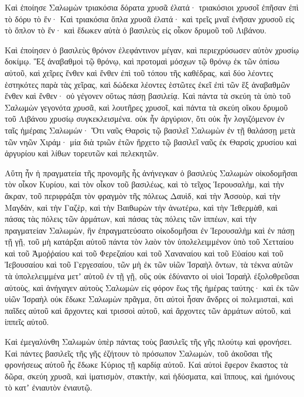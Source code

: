 {\par }{\PP {}Καὶ ἐποίησε Σαλωμὼν τριακόσια δόρατα χρυσᾶ ἐλατά· τριακόσιοι χρυσοῖ ἐπῆσαν ἐπὶ τὸ δόρυ τὸ ἕν·
Καὶ τριακόσια ὅπλα χρυσᾶ ἐλατά· καὶ τρεῖς μναῖ ἐνῆσαν χρυσοῦ εἰς τὸ ὅπλον τὸ ἕν· καὶ ἔδωκεν αὐτὰ ὁ βασιλεὺς εἰς οἶκον δρυμοῦ τοῦ Λιβάνου.
\par }{\PP {}Καὶ ἐποίησεν ὁ βασιλεὺς θρόνον ἐλεφάντινον μέγαν, καὶ περιεχρύσωσεν αὐτὸν χρυσίῳ δοκίμῳ.
Ἓξ ἀναβαθμοὶ τῷ θρόνῳ, καὶ προτομαὶ μόσχων τῷ θρόνῳ ἐκ τῶν ὀπίσω αὐτοῦ, καὶ χεῖρες ἔνθεν καὶ ἔνθεν ἐπὶ τοῦ τόπου τῆς καθέδρας, καὶ δύο λέοντες ἑστηκότες παρὰ τὰς χεῖρας,
καὶ δώδεκα λέοντες ἑστῶτες ἐκεῖ ἐπὶ τῶν ἓξ ἀναβαθμῶν ἔνθεν καὶ ἔνθεν· οὐ γέγονεν οὕτως πάσῃ βασιλείᾳ.
Καὶ πάντα τὰ σκεύη τὰ ὑπὸ τοῦ Σαλωμὼν γεγονότα χρυσᾶ, καὶ λουτῆρες χρυσοῖ, καὶ πάντα τὰ σκεύη οἴκου δρυμοῦ τοῦ Λιβάνου χρυσίῳ συγκεκλεισμένα. οὐκ ἦν ἀργύριον, ὅτι οὐκ ἦν λογιζόμενον ἐν ταῖς ἡμέραις Σαλωμών·
Ὅτι ναῦς Θαρσὶς τῷ βασιλεῖ Σαλωμὼν ἐν τῇ θαλάσσῃ μετὰ τῶν νηῶν Χιράμ· μία διὰ τριῶν ἐτῶν ἤρχετο τῷ βασιλεῖ ναῦς ἐκ Θαρσὶς χρυσίου καὶ ἀργυρίου καὶ λίθων τορευτῶν καὶ πελεκητῶν.
\par }{\PP {}Αὕτη ἦν ἡ πραγματεία τῆς προνομῆς ἧς ἀνήνεγκαν ὁ βασιλεὺς Σαλωμὼν οἰκοδομῆσαι τὸν οἶκον Κυρίου, καὶ τὸν οἶκον τοῦ βασιλέως, καὶ τὸ τεῖχος Ἱερουσαλὴμ, καὶ τὴν ἄκραν, τοῦ περιφράξαι τὸν φραγμὸν τῆς πόλεως Δαυὶδ, καὶ τὴν Ἀσσοὺρ, καὶ τὴν Μαγδὰν, καὶ τὴν Γαζὲρ, καὶ τὴν Βαιθωρὼν τὴν ἀνωτέρω, καὶ τὴν Ἰεθερμὰθ, καὶ πάσας τὰς πόλεις τῶν ἁρμάτων, καὶ πάσας τὰς πόλεις τῶν ἱππέων, καὶ τὴν πραγματείαν Σαλωμὼν, ἣν ἐπραγματεύσατο οἰκοδομῆσαι ἐν Ἱερουσαλὴμ καὶ ἐν πάσῃ τῇ γῇ, τοῦ μὴ κατάρξαι αὐτοῦ
πάντα τὸν λαὸν τὸν ὑπολελειμμένον ὑπὸ τοῦ Χετταίου καὶ τοῦ Ἀμοῤῥαίου καὶ τοῦ Φερεζαίου καὶ τοῦ Χαναναίου καὶ τοῦ Εὐαίου καὶ τοῦ Ἰεβουσαίου καὶ τοῦ Γεργεσαίου, τῶν μὴ ἐκ τῶν υἱῶν Ἰσραὴλ ὄντων, τὰ τέκνα αὐτῶν τὰ ὑπολελειμμένα μετʼ αὐτοῦ ἐν τῇ γῇ, οὓς οὐκ ἐδύναντο οἱ υἱοὶ Ἰσραὴλ ἐξολοθρεῦσαι αὐτοὺς, καὶ ἀνήγαγεν αὐτοὺς Σαλωμὼν εἰς φόρον ἕως τῆς ἡμέρας ταύτης·
καὶ ἐκ τῶν υἱῶν Ἰσραὴλ οὐκ ἔδωκε Σαλωμὼν πρᾶγμα, ὅτι αὐτοὶ ἦσαν ἄνδρες οἱ πολεμισταὶ, καὶ παῖδες αὐτοῦ καὶ ἄρχοντες καὶ τρισσοὶ αὐτοῦ, καὶ ἄρχοντες τῶν ἁρμάτων αὐτοῦ, καὶ ἱππεῖς αὐτοῦ.
\par }{\PP {}Καὶ ἐμεγαλύνθη Σαλωμὼν ὑπὲρ πάντας τοὺς βασιλεῖς τῆς γῆς πλούτῳ καὶ φρονήσει.
Καὶ πάντες βασιλεῖς τῆς γῆς ἐζήτουν τὸ πρόσωπον Σαλωμὼν, τοῦ ἀκοῦσαι τῆς φρονήσεως αὐτοῦ ἧς ἔδωκε Κύριος τῇ καρδίᾳ αὐτοῦ.
Καὶ αὐτοὶ ἔφερον ἕκαστος τὰ δῶρα, σκεύη χρυσᾶ, καὶ ἱματισμὸν, στακτὴν, καὶ ἡδύσματα, καὶ ἵππους, καὶ ἡμιόνους τὸ κατʼ ἐνιαυτὸν ἐνιαυτῷ.
}
